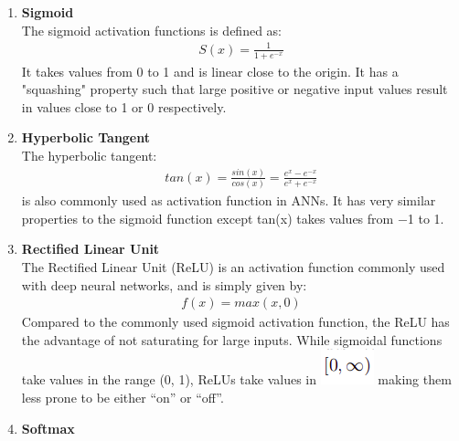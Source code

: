            \begin{enumerate}
                \item \textbf{Sigmoid} \\ 
                    \vspace{3mm}
                    The sigmoid activation functions is defined as: 
                    \begin{align}
                        S(x) = \frac{1}{1 + e^{-x}}
                    \end{align}
                    It takes values from 0 to 1 and is linear close to the origin. It has a "squashing" 
                    property such that large positive or negative input values result in values close to 1
                    or 0 respectively.
                \item \textbf{Hyperbolic Tangent} \\ 
                    \vspace{3mm}
                    The hyperbolic tangent: 
                    \begin{align}
                        tan(x) = \frac{sin(x)}{cos(x)} = \frac{e^x - e^{-x}}{e^x + e^{-x}}
                    \end{align}
                    is also commonly used as activation function in ANNs. It has very similar properties
                    to the sigmoid function except tan(x) takes values from −1 to 1.
                \item \textbf{Rectified Linear Unit} \\ 
                    \vspace{3mm}
                    The Rectified Linear Unit (ReLU) is an activation function commonly used with
                    deep neural networks, and is simply given by:
                    \begin{align}
                        f(x) = max(x,0)
                    \end{align}
                    Compared to the commonly used sigmoid activation function, the ReLU has the
                    advantage of not saturating for large inputs. While sigmoidal functions take values
                    in the range (0, 1), ReLUs take values in \includegraphics[scale=0.4]{img/range.png} making them less prone to be either
                    “on” or “off”.
                \item \textbf{Softmax} \\ 

\end{enumerate}
